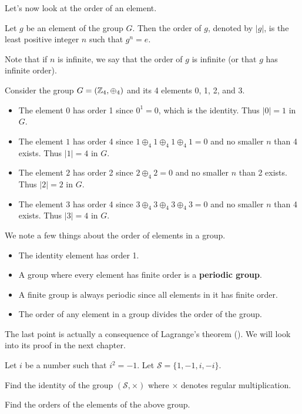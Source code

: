 Let's now look at the order of an element.
\begin{definition}
    Let $g$ be an element of the group $G$. Then the order of $g$, denoted by $|g|$, is the least positive integer $n$ such that $g^n = e$.
\end{definition}
Note that if $n$ is infinite, we say that the order of $g$ is infinite (or that $g$ has infinite order).

\begin{example}
    Consider the group $G = (\mathbb{Z}_4, \oplus_4)$ and its 4 elements 0, 1, 2, and 3.
    \begin{itemize}
        \item The element $0$ has order 1 since $0^1 = 0$, which is the identity. Thus $|0| = 1$ in $G$.
        \item The element $1$ has order 4 since $1 \oplus_4 1 \oplus_4 1 \oplus_4 1 = 0$ and no smaller $n$ than 4 exists. Thus $|1| = 4$ in $G$.
        \item The element $2$ has order 2 since $2 \oplus_4 2 = 0$ and no smaller $n$ than 2 exists. Thus $|2| = 2$ in $G$.
        \item The element $3$ has order 4 since $3 \oplus_4 3 \oplus_4 3 \oplus_4 3 = 0$ and no smaller $n$ than 4 exists. Thus $|3| = 4$ in $G$.
    \end{itemize}
\end{example}

We note a few things about the order of elements in a group.
\begin{itemize}
    \item The identity element has order 1.
    \item A group where every element has finite order is a \textbf{periodic group}.
    \item A finite group is always periodic since all elements in it has finite order.
    \item The order of any element in a group divides the order of the group.
\end{itemize}
The last point is actually a consequence of Lagrange's theorem (). We will look into its proof in the next chapter.

\begin{exercise}
    Let $i$ be a number such that $i^2 = -1$. Let $\mathcal{S} = \{1, -1, i, -i\}$.
    \begin{partquestions}{\roman*}
        \item Find the identity of the group $(\mathcal{S}, \times)$ where $\times$ denotes regular multiplication.
        \item Find the orders of the elements of the above group.
    \end{partquestions}
\end{exercise}

